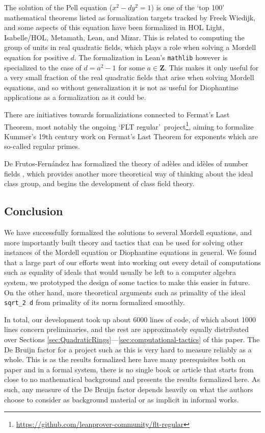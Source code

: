 \documentclass[sigplan,10pt,nonacm,
screen]{acmart} \settopmatter{printfolios=true,printccs=false,printacmref=false}
\newcommand{\tb}[1]{\todo[color=cyan]{TB: #1}}
\newcommand{\sd}[1]{\todo[color=yellow]{SD: #1}}
\newcommand{\mathlib}{\lstinline{mathlib}\xspace}
\newcommand{\ZZ}{\mathbf{Z}}
\begin{document}
The solution of the Pell equation ($x^2 -dy^2 =1$) is one of the `top 100' mathematical theorems listed as formalization targets tracked by Freek Wiedijk, and some aspects of this equation have been formalized in HOL Light, Isabelle/HOL, Metamath, Lean, and Mizar.
This is related to computing the group of units in real quadratic fields, which plays a role when solving a Mordell equation for positive $d$.
The formalization in Lean's \mathlib however is specialized to the case of $d = a^ 2 - 1$ for some $a \in \ZZ$.
This makes it only useful for a very small fraction of the real quadratic fields that arise when solving Mordell equations, and so without generalization it is not as useful for Diophantine applications as a formalization as it could be.

There are initiatives towards formaliziations connected to Fermat's Last Theorem, most notably the ongoing \lq FLT regular\rq\ project\footnote{\url{https://github.com/leanprover-community/flt-regular}}, %
aiming to formalize Kummer's 19th century work on Fermat's Last Theorem for exponents which are so-called regular primes.

De Frutos-Fernández has formalized the theory of adèles and idèles of number fields \cite{de_frutos-fernandez_formalizing_2022}, which provides another more theoretical way of thinking about the ideal class group, and begins the development of class field theory.

\subsection{Conclusion}\label{sec:Conclusion}

We have successfully formalized the solutions to several Mordell equations,
and more importantly built theory and tactics that can be used for solving other instances of the Mordell equation or Diophantine equations in general.
We found that a large part of our efforts went into working out every detail of computations such as equality of ideals that would usually be left to a computer algebra system, we prototyped the design of some tactics to make this easier in future.
On the other hand, more theoretical arguments such as primality of the ideal \lstinline{sqrt_2 d} from primality of its norm formalized smoothly.

In total, our development took up about 6000 lines of code, of which about 1000 lines concern preliminaries, and the rest are approximately equally distributed over Sections \ref{sec:QuadraticRings}---\ref{sec:computational-tactics} of this paper. %
The De Bruijn factor for a project such as this is very hard to measure reliably as a whole.
This is as the results formalized here have many prerequisites both on paper and in a formal system, there is no single book or article that starts from close to no mathematical background and presents the results formalized here.
As such, any measure of the De Bruijn factor depends heavily on what the authors choose to consider as background material or as implicit in informal works.
\end{document}
